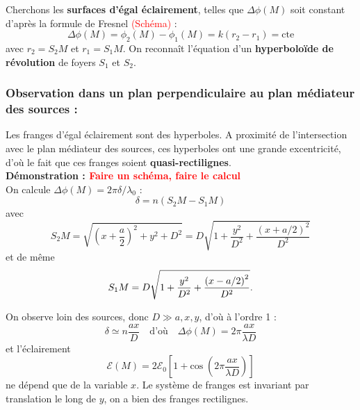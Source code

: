 \documentclass[11pt,a4paper]{report}
\begin{document}
Cherchons les \textbf{surfaces d'égal éclairement}, telles que $\Delta \phi(M)$ soit constant d'après la formule de Fresnel \textcolor{red}{(Schéma)} :
\begin{equation}
	\Delta \phi(M) = \phi_2(M) - \phi_1(M) = k\left(r_2 - r_1 \right) 
	= \text{cte}
\end{equation}
avec $r_2 = S_2M$ et $r_1 = S_1M$. On reconnaît l'équation d'un \textbf{hyperboloïde de révolution} de foyers $S_1$ et $S_2$.

\subsubsection{Observation dans un plan perpendiculaire au plan médiateur des sources :}

Les franges d'égal éclairement sont des hyperboles. A proximité de l'intersection avec le plan médiateur des sources, ces hyperboles ont une grande excentricité, d'où le fait que ces franges soient \textbf{quasi-rectilignes}.\\

\textbf{Démonstration : \textcolor{red}{Faire un schéma, faire le calcul}}\\

On calcule $\Delta\phi(M) = 2\pi\delta/\lambda_0$ :
\begin{equation}
	\delta = n\left(S_2M - S_1M\right)
\end{equation}
avec
\begin{equation}
	S_2M = \sqrt{\left(x + \frac{a}{2}\right)^2 + y^2 + D^2} 
	= D\sqrt{1 + \frac{y^2}{D^2} + \frac{\left(x+a/2\right)^2}{D^2}}
\end{equation}
et de même
\begin{equation}
	S_1M = D\sqrt{1 + \frac{y^2}{D^2} + \frac{\left(x-a/2\right)^2}{D^2}}.\\
\end{equation}

On observe loin des sources, donc $D \gg a, x, y$, d'où à l'ordre 1 :
\begin{equation}
	\boxed{\delta \simeq n \frac{ax}{D}}\quad\text{d'où}\quad \Delta\phi(M) = 2\pi\frac{ax}{\lambda D}
\end{equation}
et l'éclairement
\begin{equation}
	\boxed{\mathcal{E}(M) = 2\mathcal{E}_0\left[1 + 
	\text{cos}\;\left(2\pi\frac{ax}{\lambda D}\right)\right]}
\end{equation}
ne dépend que de la variable $x$. Le système de franges est invariant par translation le long de $y$, on a bien des franges rectilignes.\\
\end{document}
